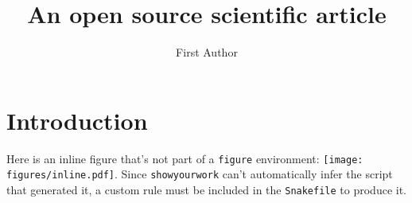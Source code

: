 \documentclass[twocolumn]{aastex631}
\begin{document}
\title{An open source scientific article}

\author{First Author}

\begin{abstract}
    \blindtext
\end{abstract}

\section{Introduction}
Here is an inline figure that's not part of a \verb+figure+ environment: \texttt{[image: figures/inline.pdf]}. 
Since \texttt{showyourwork} can't automatically infer the script that generated it, a custom rule must be included in the \texttt{Snakefile} to produce it.
\end{document}
